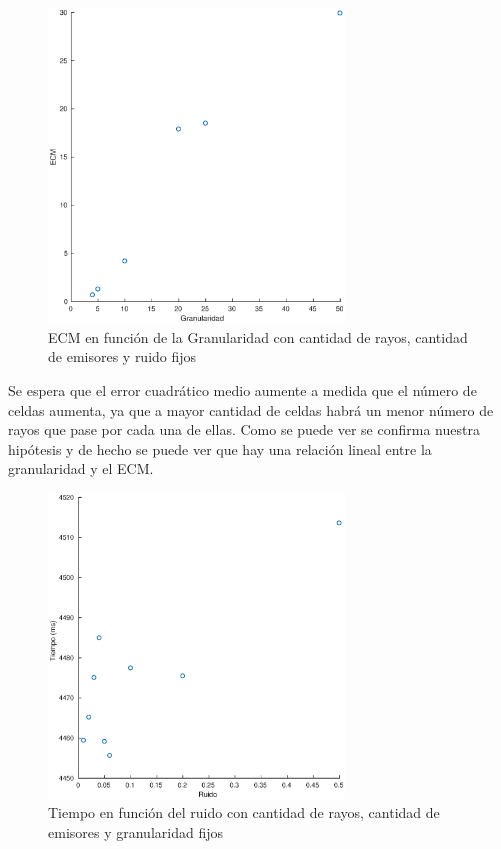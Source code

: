\begin{figure}[H]
	\centering	\includegraphics[width=0.7\textwidth]{img/granu_ecm}
	\caption{ECM en función de la Granularidad con cantidad de rayos, cantidad de emisores y ruido fijos}
	\label{fig:granu_ecm}
\end{figure}
Se espera que el error cuadrático medio aumente a medida que el número de celdas aumenta, ya que a mayor cantidad de celdas habrá un menor número de rayos que pase por cada una de ellas. Como se puede ver se confirma nuestra hipótesis y de hecho se puede ver que hay una relación lineal entre la granularidad y el ECM.

\begin{figure}[H]
	\centering	\includegraphics[width=0.7\textwidth]{img/ruido_tiempo}
	\caption{Tiempo en función del ruido con cantidad de rayos, cantidad de emisores y granularidad fijos}
	\label{fig:ruido_tiempo}
\end{figure}

